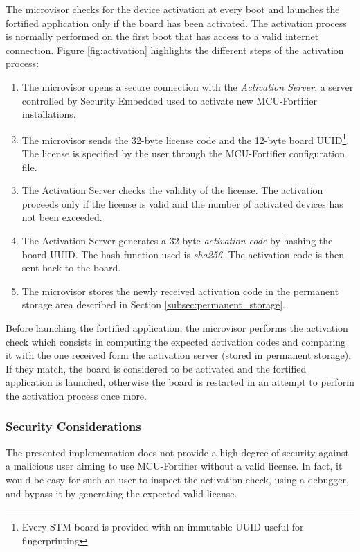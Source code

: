 \documentclass{article}
\begin{document}
The microvisor checks for the device activation at every boot and launches the fortified application only if the board has been activated.
The activation process is normally performed on the first boot that has access to a valid internet connection. Figure \ref{fig:activation} highlights the different steps of the activation process:
\begin{enumerate}
	\item The microvisor opens a secure connection with the \textit{Activation Server}, a server controlled by Security Embedded used to activate new MCU-Fortifier installations.
	\item The microvisor sends the 32-byte license code and the 12-byte board UUID\footnote{Every STM board is provided with an immutable UUID useful for fingerprinting}. The license is specified by the user through the MCU-Fortifier configuration file.
	\item The Activation Server checks the validity of the license. The activation proceeds only if the license is valid and the number of activated devices has not been exceeded.
	\item The Activation Server generates a 32-byte \textit{activation code} by hashing the board UUID. The hash function used is \textit{sha256}. The activation code is then sent back to the board.
	\item The microvisor stores the newly received activation code in the permanent storage area described in Section \ref{subsec:permanent_storage}.
\end{enumerate}

Before launching the fortified application, the microvisor performs the activation check which consists in computing the expected activation codes and comparing it with the one received form the activation server (stored in permanent storage). If they match, the board is considered to be activated and the fortified application is launched, otherwise the board is restarted in an attempt to perform the activation process once more.

\subsubsection{Security Considerations}
The presented implementation does not provide a high degree of security against a malicious user aiming to use MCU-Fortifier without a valid license. In fact, it would be easy for such an user to inspect the activation check, using a debugger, and bypass it by generating the expected valid license.
\end{document}
